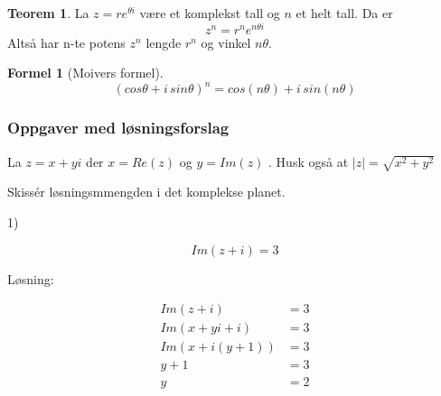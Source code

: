 \documentclass[11pt]{article}
\theoremstyle{definition}
\theoremstyle{definition}
\theoremstyle{definition}
\theoremstyle{definition}
\newtheorem{teo}{Teorem}[section]
\newenvironment{fteo}
{\begin{mdframed}[style=minstil]\begin{teo}}
		{\end{teo}\end{mdframed}}
\theoremstyle{definition}
\theoremstyle{definition}
\newtheorem{formel}{Formel}
\begin{document}
	\begin{fteo}
		La \(z=re^{\theta i}\) være et komplekst tall og \(n\) et helt tall. Da er \[z^n = r^n e^{n\theta i}\] Altså har n-te potens \(z^n\) lengde \(r^n\) og vinkel \(n\theta \).
	\end{fteo}
	
	\begin{formel}[Moivers formel]
		\begin{equation}
		(cos\theta + i\, sin\theta )^n =  cos(n\theta) + i\, sin(n\theta)
		\end{equation}		
	\end{formel}
	
	\newpage
	
	\subsubsection{Oppgaver med løsningsforslag}
		La \(z=x+yi\) der \(x=Re(z)\) og \(y=Im(z)\) . Husk også at \(|z|=\sqrt{x^2+y^2}\)
	
		Skissér løsningsmmengden i det komplekse planet.
	
	1)
	
	\[Im(z+i)=3\]
	
	Løsning:
	
	
	\begin{align*}
	Im(z+i)&=3		\\
	Im(x+yi+i)&=3   \\
	Im(x+i(y+1))&=3 \\
	y+1&=3          \\
	y&=2
	\end{align*}
	
	\begin{center}
	\end{center}
	
\end{document}
